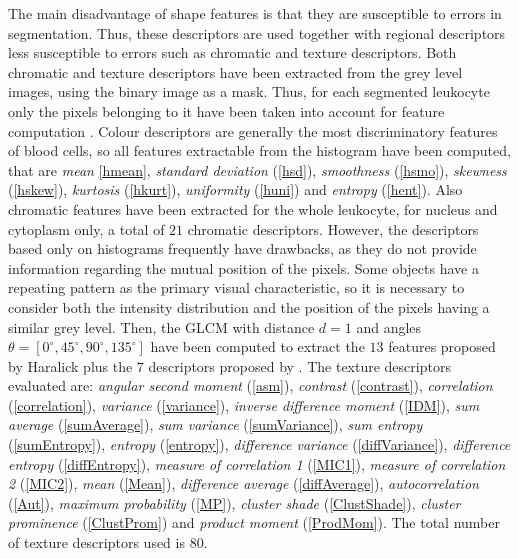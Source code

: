 \documentclass[final,a4paper,12pt,english]{UnicaPhdThesis3}
\begin{document}
	The  main  disadvantage of shape  features  is that  they  are susceptible to errors in segmentation. Thus, these descriptors  are used together  with  regional descriptors less susceptible to errors such as chromatic and texture descriptors.
	Both chromatic and texture descriptors have been extracted from the grey level images, using the binary image as a mask. Thus, for each segmented leukocyte only the pixels belonging to it have been taken into account for feature computation \cite{Put14b}. Colour descriptors are generally the most discriminatory features of blood cells, so all features extractable from the histogram have been computed, that are \textit{mean} \ref{hmean},  \textit{standard deviation} (\ref{hsd}), \textit{smoothness} (\ref{hsmo}), \textit{skewness} (\ref{hskew}), \textit{kurtosis} (\ref{hkurt}), \textit{uniformity} (\ref{huni}) and \textit{entropy} (\ref{hent}). Also chromatic features have been extracted for the whole leukocyte, for nucleus and cytoplasm only, a total of $21$ chromatic descriptors.
	However, the descriptors based only on histograms frequently have drawbacks, as they do not provide information regarding the mutual  position of the pixels. Some objects have a repeating  pattern as the primary  visual characteristic, so it is necessary to consider both the intensity distribution and the position of the pixels having a similar grey level. Then, the GLCM with distance $d = 1$ and angles $\theta = [0 ^\circ, 45 ^\circ, 90 ^\circ, 135 ^\circ]$ have been computed to extract the $13$ features proposed by Haralick \cite{Haralick} plus the $7$ descriptors proposed by \cite{Soh, Clausi}. The texture descriptors evaluated are: \textit{angular second moment} (\ref{asm}), \textit{contrast} (\ref{contrast}), \textit{correlation} (\ref{correlation}), \textit{variance} (\ref{variance}), \textit{inverse difference moment} (\ref{IDM}), \textit{sum average} (\ref{sumAverage}), \textit{sum variance} (\ref{sumVariance}), \textit{sum entropy} (\ref{sumEntropy}), \textit{entropy} (\ref{entropy}), \textit{difference variance} (\ref{diffVariance}), \textit{difference entropy} (\ref{diffEntropy}), \textit{measure of correlation 1} (\ref{MIC1}), \textit{measure of correlation 2} (\ref{MIC2}), \textit{mean} (\ref {Mean}), \textit{difference average} (\ref{diffAverage}), \textit{autocorrelation} (\ref{Aut}), \textit{maximum probability} (\ref{MP}), \textit{cluster shade} (\ref{ClustShade}),  \textit{cluster prominence} (\ref {ClustProm}) and \textit{product moment} (\ref {ProdMom}). The total number of texture descriptors used is $80$.
	
\end{document}
